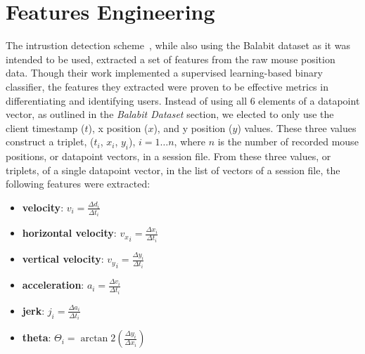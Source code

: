 \section{Features Engineering}\label{sec:features-engineering}
The intrustion detection scheme~\cite{intrustion_detection_using_mouse_dynamics}, while also using the Balabit dataset as it was intended to be used, extracted a set of features from the raw mouse position data.
Though their work implemented a supervised learning-based binary classifier, the features they extracted were proven to be effective metrics in differentiating and identifying users.
Instead of using all 6 elements of a datapoint vector, as outlined in the \textit{Balabit Dataset} section, we elected to only use the client timestamp ($t$), x position ($x$), and y position ($y$) values.
These three values construct a triplet, ($t_i$, $x_i$, $y_i$), $i = 1{\dots}n$, where $n$ is the number of recorded mouse positions, or datapoint vectors, in a session file.
From these three values, or triplets, of a single datapoint vector, in the list of vectors of a session file, the following features were extracted:
\begin{itemize}
    \item \textbf{velocity}: $v_i = \frac{\Delta d_i}{\Delta t_i}$
    \item \textbf{horizontal velocity}: ${v_x}_i = \frac{\Delta x_i}{\Delta t_i}$
    \item \textbf{vertical velocity}: ${v_y}_i = \frac{\Delta y_i}{\Delta t_i}$
    \item \textbf{acceleration}: $a_i = \frac{\Delta v_i}{\Delta t_i}$
    \item \textbf{jerk}: $j_i = \frac{\Delta a_i}{\Delta t_i}$
    \item \textbf{theta}: $\Theta _i = \arctan 2(\frac{\Delta y_i}{\Delta x_i})$
\end{itemize}

